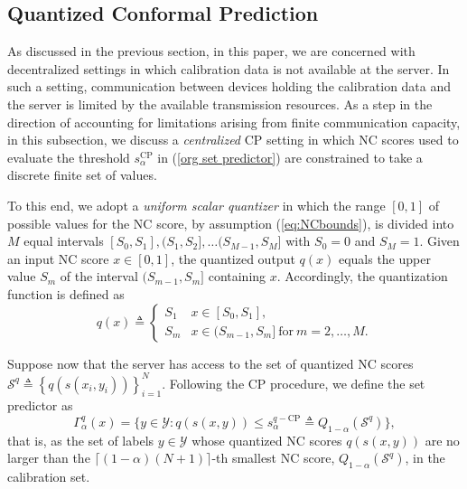 \documentclass[12pt, draftclsnofoot, onecolumn]{IEEEtran}
\begin{document}

\subsection{Quantized Conformal Prediction}\label{quantized CP}
As discussed in the previous section, in this paper, we are concerned with decentralized settings in which calibration data is not available at the server. In such a setting, communication between devices holding the calibration data and the server is limited by the available transmission resources. As a step in the direction of accounting for limitations arising from finite communication capacity, in this subsection, we discuss a \emph{centralized} CP setting in which NC scores used to evaluate the threshold $s^{\text{CP}}_\alpha$ in (\ref{org set predictor}) are constrained to take a discrete finite set of values.

To this end, we adopt a \emph{uniform scalar quantizer} in which the range $[0,1]$ of possible values for the NC score, by assumption (\ref{eq:NCbounds}), is divided into $M$ equal intervals $[S_0,S_1], (S_1,S_2],\ldots (S_{M-1},S_M]$ with $S_0=0$ and $S_M=1$. Given an input NC score $x\in [0,1]$, the quantized output $q(x)$ equals the upper value $S_m$ of the interval $(S_{m-1},S_m]$ containing $x$.
Accordingly, the quantization function is defined as 
\begin{equation}\label{quantizer}
    q \left(x\right)\triangleq
    \begin{cases}
        S_1 & \text{$x\in[S_0,S_1]$},\\
        S_m & \text{$x\in(S_{m-1},S_m]$}~\text{for}~m=2,\ldots,M.
    \end{cases}
\end{equation}

Suppose now that the server has access to the set of quantized NC scores $\mathcal{S}^{q}\triangleq\left\{q(s(x_i,y_i))\right\}_{i=1}^N$. Following the CP procedure, we define the set predictor as
\begin{equation}\label{set_predictor_p}
    \Gamma^q_{\alpha}(x) = \{y \in \mathcal{Y}: q(s(x, y)) \leq s^{q-\text{CP}}_{\alpha} \triangleq Q_{1-\alpha}(\mathcal{S}^q) \},
\end{equation}
that is, as the set of labels $y\in\mathcal{Y}$ whose quantized NC scores $q(s(x, y))$ are no larger than the $\lceil(1-\alpha)(N+1)\rceil$-th smallest NC score, $Q_{1-\alpha}(\mathcal{S}^q)$, in the calibration set.
\end{document}

